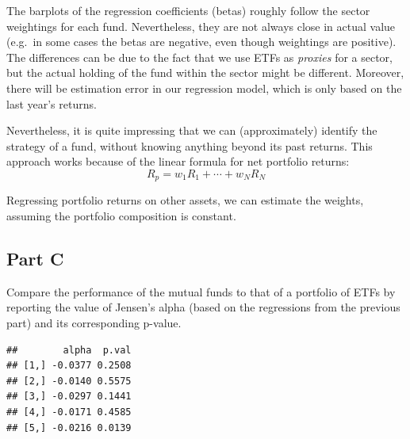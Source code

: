\documentclass[
  oneside]{book}
\newenvironment{Shaded}{\begin{snugshade}}{\end{snugshade}}
\newcommand{\CommentTok}[1]{\textcolor[rgb]{0.56,0.35,0.01}{\textit{#1}}}
\newcommand{\ControlFlowTok}[1]{\textcolor[rgb]{0.13,0.29,0.53}{\textbf{#1}}}
\newcommand{\DecValTok}[1]{\textcolor[rgb]{0.00,0.00,0.81}{#1}}
\newcommand{\FunctionTok}[1]{\textcolor[rgb]{0.00,0.00,0.00}{#1}}
\newcommand{\NormalTok}[1]{#1}
\newcommand{\OtherTok}[1]{\textcolor[rgb]{0.56,0.35,0.01}{#1}}
\newcommand{\SpecialCharTok}[1]{\textcolor[rgb]{0.00,0.00,0.00}{#1}}
\begin{document}
The barplots of the regression coefficients (betas) roughly follow the sector weightings for each fund. Nevertheless, they are not always close in actual value (e.g.~in some cases the betas are negative, even though weightings are positive). The differences can be due to the fact that we use ETFs as \emph{proxies} for a sector, but the actual holding of the fund within the sector might be different. Moreover, there will be estimation error in our regression model, which is only based on the last year's returns.

Nevertheless, it is quite impressing that we can (approximately) identify the strategy of a fund, without knowing anything beyond its past returns. This approach works because of the linear formula for net portfolio returns:
\[ R_p = w_1 R_1 + \cdots + w_N R_N\]

Regressing portfolio returns on other assets, we can estimate the weights, assuming the portfolio composition is constant.

\hypertarget{part-c-5}{%
\subsection{Part C}\label{part-c-5}}

Compare the performance of the mutual funds to that of a portfolio of ETFs by reporting the value of Jensen's alpha (based on the regressions from the previous part) and its corresponding p-value.

\begin{Shaded}
\end{Shaded}

\begin{verbatim}
##        alpha  p.val
## [1,] -0.0377 0.2508
## [2,] -0.0140 0.5575
## [3,] -0.0297 0.1441
## [4,] -0.0171 0.4585
## [5,] -0.0216 0.0139
\end{verbatim}
\end{document}
